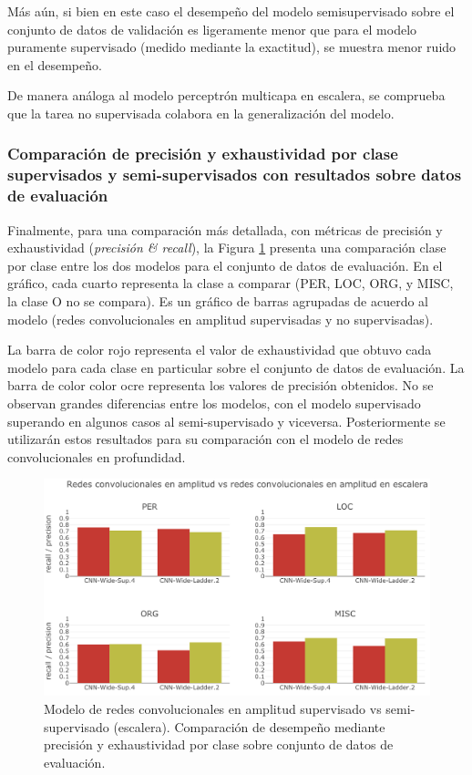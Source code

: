 Más aún, si bien en este caso el desempeño del modelo semisupervisado sobre el conjunto de datos de validación
es ligeramente menor que para el modelo puramente supervisado (medido mediante la exactitud), se muestra menor
ruido en el desempeño.

De manera análoga al modelo perceptrón multicapa en escalera, se comprueba que la tarea no supervisada 
colabora en la generalización del modelo.

\subsubsection{Comparación de precisión y exhaustividad por clase supervisados y semi-supervisados con 
resultados sobre datos de evaluación}

Finalmente, para una comparación más detallada, con métricas de precisión y exhaustividad ({\em precisión \& 
recall}), la Figura \ref{fig:CNN_wide_supervised_ladder_precision_recall} presenta una comparación clase por 
clase entre los dos modelos para el conjunto de datos de evaluación. En el gráfico, cada cuarto representa la 
clase a comparar (PER, LOC, ORG, y MISC, la clase O no se compara). Es un gráfico de barras agrupadas de 
acuerdo al modelo (redes convolucionales en amplitud supervisadas y no supervisadas).

La barra de color rojo representa el valor de exhaustividad que obtuvo cada modelo para cada clase en 
particular sobre el conjunto de datos de evaluación. La barra de color color ocre representa los valores de 
precisión obtenidos. No se observan grandes diferencias entre los modelos, con el modelo supervisado superando
en algunos casos al semi-supervisado y viceversa. Posteriormente se utilizarán estos resultados para su 
comparación con el modelo de redes convolucionales en profundidad.

\begin{figure}[h]
\begin{center}
\includegraphics[width=.9\linewidth]{images/CNN_wide_supervised_ladder_precision_recall.png}
\caption{Modelo de redes convolucionales en amplitud supervisado vs semi-supervisado (escalera). Comparación
de desempeño mediante precisión y exhaustividad por clase sobre conjunto de datos de evaluación.}
\label{fig:CNN_wide_supervised_ladder_precision_recall}
\end{center}
\end{figure}

